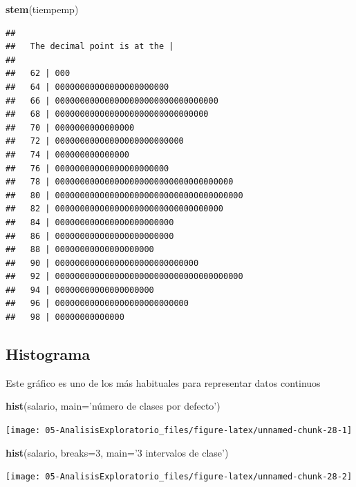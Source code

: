 \documentclass[]{book}
\newenvironment{Shaded}{\begin{snugshade}}{\end{snugshade}}
\newcommand{\KeywordTok}[1]{\textcolor[rgb]{0.13,0.29,0.53}{\textbf{#1}}}
\newcommand{\DataTypeTok}[1]{\textcolor[rgb]{0.13,0.29,0.53}{#1}}
\newcommand{\DecValTok}[1]{\textcolor[rgb]{0.00,0.00,0.81}{#1}}
\newcommand{\StringTok}[1]{\textcolor[rgb]{0.31,0.60,0.02}{#1}}
\newcommand{\NormalTok}[1]{#1}
\begin{document}
\begin{Shaded}
\begin{Highlighting}[]
\KeywordTok{stem}\NormalTok{(tiempemp)}
\end{Highlighting}
\end{Shaded}

\begin{verbatim}
## 
##   The decimal point is at the |
## 
##   62 | 000
##   64 | 00000000000000000000000
##   66 | 000000000000000000000000000000000
##   68 | 0000000000000000000000000000000
##   70 | 0000000000000000
##   72 | 00000000000000000000000000
##   74 | 000000000000000
##   76 | 00000000000000000000000
##   78 | 000000000000000000000000000000000000
##   80 | 00000000000000000000000000000000000000
##   82 | 0000000000000000000000000000000000
##   84 | 000000000000000000000000
##   86 | 000000000000000000000000
##   88 | 00000000000000000000
##   90 | 00000000000000000000000000000
##   92 | 00000000000000000000000000000000000000
##   94 | 00000000000000000000
##   96 | 000000000000000000000000000
##   98 | 00000000000000
\end{verbatim}

\subsection{Histograma}\label{histograma}

Este gráfico es uno de los más habituales para representar datos
continuos

\begin{Shaded}
\begin{Highlighting}[]
\KeywordTok{hist}\NormalTok{(salario, }\DataTypeTok{main=}\StringTok{'número de clases por defecto'}\NormalTok{)}
\end{Highlighting}
\end{Shaded}

\begin{center}\texttt{[image: 05-AnalisisExploratorio\_files/figure-latex/unnamed-chunk-28-1]} \end{center}

\begin{Shaded}
\begin{Highlighting}[]
\KeywordTok{hist}\NormalTok{(salario, }\DataTypeTok{breaks=}\DecValTok{3}\NormalTok{, }\DataTypeTok{main=}\StringTok{'3 intervalos de clase'}\NormalTok{)}
\end{Highlighting}
\end{Shaded}

\begin{center}\texttt{[image: 05-AnalisisExploratorio\_files/figure-latex/unnamed-chunk-28-2]} \end{center}
\end{document}
